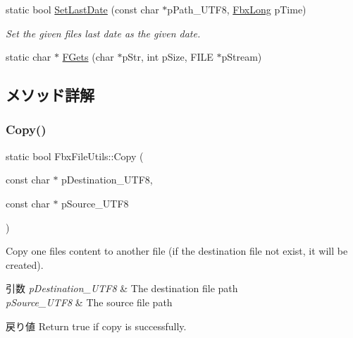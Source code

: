 \begin{DoxyCompactItemize}
static bool \hyperlink{class_fbx_file_utils_a5bdf966c2556bd9c4a86121452788053}{Set\+Last\+Date} (const char $\ast$p\+Path\+\_\+\+U\+T\+F8, \hyperlink{fbxtypes_8h_a70c7780f9a9ff5b9b08ab757b34e0726}{Fbx\+Long} p\+Time)
\begin{DoxyCompactList}\small\item\em Set the given file\textquotesingle{}s last date as the given date. \end{DoxyCompactList}\item 
static char $\ast$ \hyperlink{class_fbx_file_utils_aa828e725caf5d34b9ae12abc1c0b8993}{F\+Gets} (char $\ast$p\+Str, int p\+Size, F\+I\+LE $\ast$p\+Stream)
\end{DoxyCompactItemize}


\subsection{メソッド詳解}
\mbox{\label{class_fbx_file_utils_aeb9e95e483ce2430c54669c507fa2e21}} 
\subsubsection{\texorpdfstring{Copy()}{Copy()}}
{\footnotesize\ttfamily static bool Fbx\+File\+Utils\+::\+Copy (\begin{DoxyParamCaption}\item[{const char $\ast$}]{p\+Destination\+\_\+\+U\+T\+F8,  }\item[{const char $\ast$}]{p\+Source\+\_\+\+U\+T\+F8 }\end{DoxyParamCaption})\hspace{0.3cm}{\ttfamily [static]}}

Copy one file\textquotesingle{}s content to another file (if the destination file not exist, it will be created). 
\begin{DoxyParams}{引数}
{\em p\+Destination\+\_\+\+U\+T\+F8} & The destination file path \\
\hline
{\em p\+Source\+\_\+\+U\+T\+F8} & The source file path \\
\hline
\end{DoxyParams}
\begin{DoxyReturn}{戻り値}
Return true if copy is successfully. 
\end{DoxyReturn}
\mbox{\label{class_fbx_file_utils_adfd2d189a647cb9c90b8773868e6f36e}} 
